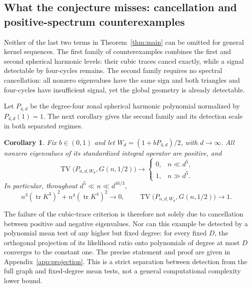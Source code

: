 \documentclass[11pt,reqno]{amsart}
\numberwithin{equation}{section}
\newtheorem{corollary}[theorem]{Corollary}
\theoremstyle{definition}
\theoremstyle{remark}
\theoremstyle{definition}
\DeclareMathOperator{\tr}{tr}
\DeclareMathOperator{\TV}{TV}
\begin{document}
\subsection{What the conjecture misses: cancellation and positive-spectrum counterexamples}
Neither of the last two terms in Theorem~\ref{thm:main} can be omitted for general kernel sequences.
The first family of counterexamples combines the first and second spherical harmonic levels: their cubic traces cancel exactly,
while a signal detectable by four-cycles remains.
The second family requires no spectral cancellation: all nonzero eigenvalues have the same sign and both triangles and four-cycles have insufficient signal,
yet the global geometry is already detectable.

Let $P_{4,d}$ be the degree-four zonal spherical harmonic polynomial normalized by $P_{4,d}(1)=1$.
The next corollary gives the second family and its detection scale in both separated regimes.

\begin{corollary}\label{cor:quartic}
Fix $b\in(0,1)$ and let $W_d=(1+bP_{4,d})/2$, with $d\to\infty$.
All nonzero eigenvalues of its standardized integral operator are positive, and
\begin{equation}\label{eq:quartic-threshold}
 \TV\bigl(P_{n,d,W_d},G(n,1/2)\bigr)\longrightarrow
 \begin{cases}
 0,& n\ll d^5,\\[2pt]
 1,& n\gg d^5.
 \end{cases}
\end{equation}
In particular, throughout $d^5\ll n\ll d^{16/3}$,
\begin{equation}\label{eq:intro-gap}
 n^3(\tr K^3)^2+n^4(\tr K^4)^2\longrightarrow0,
 \qquad \TV\bigl(P_{n,d,W_d},G(n,1/2)\bigr)\longrightarrow1.
\end{equation}
\end{corollary}

The failure of the cubic-trace criterion is therefore not solely due to cancellation between positive and negative eigenvalues.
Nor can this example be detected by a polynomial mean test of any higher but fixed degree:
for every fixed $D$, the orthogonal projection of its likelihood ratio onto polynomials of degree at most $D$ converges to the constant one.
The precise statement and proof are given in Appendix~\ref{app:projection}.
This is a strict separation between detection from the full graph and fixed-degree mean tests, not a general computational complexity lower bound.
\end{document}
